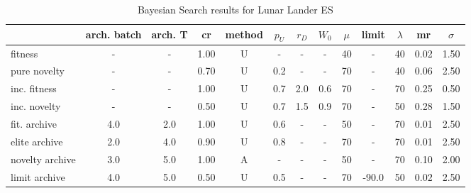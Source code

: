 \begin{table}[ht]
	\centering
	\scriptsize
	\setlength{\tabcolsep}{4pt}
	\renewcommand{\arraystretch}{1.15}
	\begin{tabular}{lcccccccccccc}
		\toprule
		{} & arch. batch & arch. T &   cr & method & $p_U$ & $r_D$ & $W_0$ & $\mu$ & limit & $\lambda$ &   mr & $\sigma$ \\
		\midrule
		fitness         &           - &       - & 1.00 &      U &     - &     - &     - &    40 &     - &        40 & 0.02 &     1.50 \\
		pure novelty    &           - &       - & 0.70 &      U &   0.2 &     - &     - &    70 &     - &        40 & 0.06 &     2.50 \\
		inc. fitness    &           - &       - & 1.00 &      U &   0.7 &   2.0 &   0.6 &    70 &     - &        70 & 0.25 &     0.50 \\
		inc. novelty    &           - &       - & 0.50 &      U &   0.7 &   1.5 &   0.9 &    70 &     - &        50 & 0.28 &     1.50 \\
		fit. archive    &         4.0 &     2.0 & 1.00 &      U &   0.6 &     - &     - &    50 &     - &        70 & 0.01 &     2.50 \\
		elite archive   &         2.0 &     4.0 & 0.90 &      U &   0.8 &     - &     - &    70 &     - &        70 & 0.01 &     2.50 \\
		novelty archive &         3.0 &     5.0 & 1.00 &      A &     - &     - &     - &    50 &     - &        70 & 0.10 &     2.00 \\
		limit archive   &         4.0 &     5.0 & 0.50 &      U &   0.5 &     - &     - &    70 & -90.0 &        50 & 0.02 &     2.50 \\
		\bottomrule
	\end{tabular}
	
	\caption{Bayesian Search results for Lunar Lander ES}
		\label{tab:optunaRes3}
\end{table}

